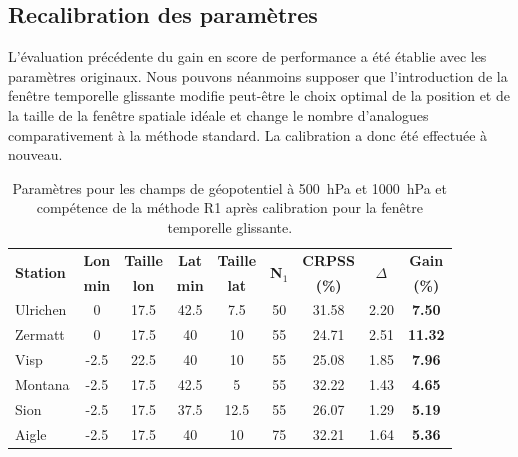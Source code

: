 \documentclass[hess]{copernicus}
\begin{document}
\subsection{Recalibration des paramètres}
\label{sec:ameliorations:fenetre:recalibration}

L'évaluation précédente du gain en score de performance a été établie avec les paramètres originaux. Nous pouvons néanmoins supposer que l'introduction de la fenêtre temporelle glissante modifie peut-être le choix optimal de la position et de la taille de la fenêtre spatiale idéale et change le nombre d'analogues comparativement à la méthode standard. La calibration a donc été effectuée à nouveau.


\begin{table}[htb]
	\caption{Paramètres pour les champs de géopotentiel à 500~hPa et 1000~hPa et compétence de la méthode R1 après calibration pour la fenêtre temporelle glissante.}
	\begin{center}
		\begin{tabular}{l c c c c c c c c }
			\hline
			\multirow{2}{*}{\textbf{Station}} & \textbf{Lon} & \textbf{Taille} & \textbf{Lat} & \textbf{Taille} & \multirow{2}{*}{\textbf{N$_{1}$}} & \textbf{CRPSS} & \multirow{2}{*}{\textbf{$\Delta$}} & \textbf{Gain} \\ 
			& \textbf{min} & \textbf{lon} & \textbf{min} & \textbf{lat} &  & \textbf{(\%)} & & \textbf{(\%)} \\ 
			\hline
			Ulrichen & 0 & 17.5 & 42.5 & 7.5 & 50 & 31.58 & 2.20 & \textbf{7.50} \\ \hline
			Zermatt & 0 & 17.5 & 40 & 10 & 55 & 24.71 & 2.51 & \textbf{11.32} \\ \hline
			Visp & -2.5 & 22.5 & 40 & 10 & 55 & 25.08 & 1.85 & \textbf{7.96} \\ \hline
			Montana & -2.5 & 17.5 & 42.5 & 5 & 55 & 32.22 & 1.43 & \textbf{4.65} \\ \hline
			Sion & -2.5 & 17.5 & 37.5 & 12.5 & 55 & 26.07 & 1.29 & \textbf{5.19} \\ \hline
			Aigle & -2.5 & 17.5 & 40 & 10 & 75 & 32.21 & 1.64 & \textbf{5.36} \\ \hline
		\end{tabular}
	\end{center}
	\label{tab:fenetre_glissante:Resultats_R1_recalibration_fen_gliss}
\end{table}
\end{document}
